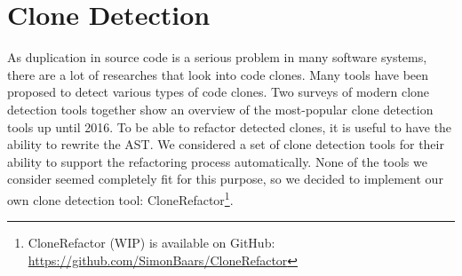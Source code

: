 \documentclass[a4paper]{article}
\begin{document}
\section{Clone Detection}
As duplication in source code is a serious problem in many software systems, there are a lot of researches that look into code clones. Many tools have been proposed to detect various types of code clones. Two surveys of modern clone detection tools \cite{sheneamer2016survey, svajlenko2014evaluating} together show an overview of the most-popular clone detection tools up until 2016. To be able to refactor detected clones, it is useful to have the ability to rewrite the AST. We considered a set of clone detection tools for their ability to support the refactoring process automatically.  None of the tools we consider seemed completely fit for this purpose, so we decided to implement our own clone detection tool: CloneRefactor\footnote{CloneRefactor (WIP) is available on GitHub: \url{https://github.com/SimonBaars/CloneRefactor}}.
\end{document}
